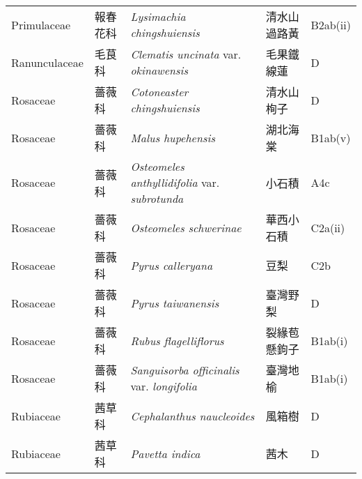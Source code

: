 {\begin{longtable}{p{2.5cm}p{2.5cm}p{4.5cm}p{2.5cm}p{3cm}}
    Primulaceae & 報春花科 & \textit{Lysimachia chingshuiensis}  & 清水山過路黃 & B2ab(ii) \index{Lysimachia@\textit{Lysimachia}!chingshuiensis@\textit{chingshuiensis}}  \index{清水山過路黃} \\
    Ranunculaceae & 毛茛科 & \textit{Clematis uncinata} var. \textit{okinawensis}  & 毛果鐵線蓮 & D \index{Clematis@\textit{Clematis}!uncinata@\textit{uncinata}!var. okinawensis@var. \textit{okinawensis}}  \index{毛果鐵線蓮} \\
    Rosaceae & 薔薇科 & \textit{Cotoneaster chingshuiensis}  & 清水山栒子 & D \index{Cotoneaster@\textit{Cotoneaster}!chingshuiensis@\textit{chingshuiensis}}  \index{清水山栒子} \\
    Rosaceae & 薔薇科 & \textit{Malus hupehensis}  & 湖北海棠 & B1ab(v) \index{Malus@\textit{Malus}!hupehensis@\textit{hupehensis}}  \index{湖北海棠} \\
    Rosaceae & 薔薇科 & \textit{Osteomeles anthyllidifolia} var. \textit{subrotunda}  & 小石積 & A4c \index{Osteomeles@\textit{Osteomeles}!anthyllidifolia@\textit{anthyllidifolia}!var. subrotunda@var. \textit{subrotunda}}  \index{小石積} \\
    Rosaceae & 薔薇科 & \textit{Osteomeles schwerinae}  & 華西小石積 & C2a(ii) \index{Osteomeles@\textit{Osteomeles}!schwerinae@\textit{schwerinae}}  \index{華西小石積} \\
    Rosaceae & 薔薇科 & \textit{Pyrus calleryana}  & 豆梨 & C2b \index{Pyrus@\textit{Pyrus}!calleryana@\textit{calleryana}}  \index{豆梨} \\
    Rosaceae & 薔薇科 & \textit{Pyrus taiwanensis}  & 臺灣野梨 & D \index{Pyrus@\textit{Pyrus}!taiwanensis@\textit{taiwanensis}}  \index{臺灣野梨} \\
    Rosaceae & 薔薇科 & \textit{Rubus flagelliflorus}  & 裂緣苞懸鉤子 & B1ab(i) \index{Rubus@\textit{Rubus}!flagelliflorus@\textit{flagelliflorus}}  \index{裂緣苞懸鉤子} \\
    Rosaceae & 薔薇科 & \textit{Sanguisorba officinalis} var. \textit{longifolia}  & 臺灣地榆 & B1ab(i) \index{Sanguisorba@\textit{Sanguisorba}!officinalis@\textit{officinalis}!var. longifolia@var. \textit{longifolia}}  \index{臺灣地榆} \\
    Rubiaceae & 茜草科 & \textit{Cephalanthus naucleoides}  & 風箱樹 & D \index{Cephalanthus@\textit{Cephalanthus}!naucleoides@\textit{naucleoides}}  \index{風箱樹} \\
    Rubiaceae & 茜草科 & \textit{Pavetta indica}  & 茜木 & D \index{Pavetta@\textit{Pavetta}!indica@\textit{indica}}  \index{茜木} \\

\end{longtable}}

